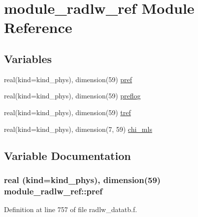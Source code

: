 \hypertarget{namespacemodule__radlw__ref}{}\section{module\+\_\+radlw\+\_\+ref Module Reference}
\label{namespacemodule__radlw__ref}
\subsection*{Variables}
\begin{DoxyCompactItemize}
\item 
real(kind=kind\+\_\+phys), dimension(59) \hyperlink{namespacemodule__radlw__ref_adda97d9a274bef59507633a3fc5a0e78}{pref}
\item 
real(kind=kind\+\_\+phys), dimension(59) \hyperlink{group__module__radlw__main_ga4206f7320b6f1b59eb0132326263d2e4}{preflog}
\item 
real(kind=kind\+\_\+phys), dimension(59) \hyperlink{group__module__radlw__main_ga56972f3948052e8b7f4717c192fc551d}{tref}
\item 
real(kind=kind\+\_\+phys), dimension(7, 59) \hyperlink{group__module__radlw__main_gadc2bbd1ac0178afda84e74ad45404d31}{chi\+\_\+mls}
\end{DoxyCompactItemize}


\subsection{Variable Documentation}
\subsubsection[{\texorpdfstring{pref}{pref}}]{\setlength{\rightskip}{0pt plus 5cm}real (kind=kind\+\_\+phys), dimension(59) module\+\_\+radlw\+\_\+ref\+::pref}\hypertarget{namespacemodule__radlw__ref_adda97d9a274bef59507633a3fc5a0e78}{}\label{namespacemodule__radlw__ref_adda97d9a274bef59507633a3fc5a0e78}


Definition at line 757 of file radlw\+\_\+datatb.\+f.

